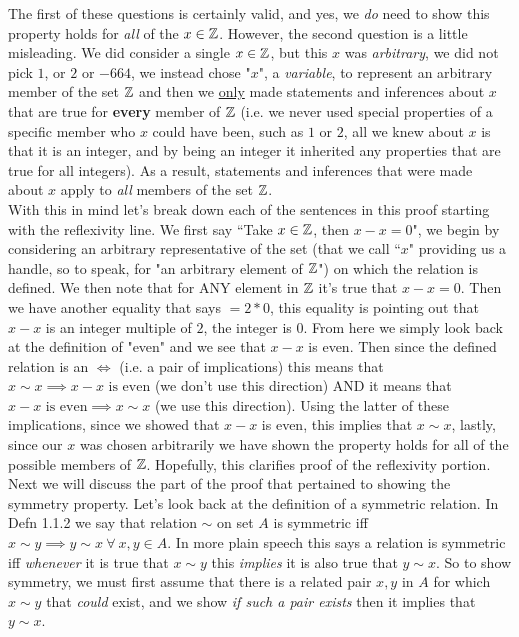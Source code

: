 \noindent The first of these questions is certainly valid, and yes, we \textit{do} need to show this property holds for \textit{all} of the $x\in {\mathbb{ Z}}$. However, the second question is a little misleading. We did consider a single $x\in {\mathbb{ Z}}$, but this $x$ was \textit{arbitrary}, we did not pick $1$, or $2$ or $-664$, we instead chose "$x$", a \textit{variable}, to represent an arbitrary member of the set ${\mathbb{ Z}}$ and then we \underline{only} made statements and inferences about $x$ that are true for \textbf{every} member of ${\mathbb{ Z}}$ (i.e. we never used special properties of a specific member who $x$ could have been, such as $1$ or $2$, all we knew about $x$ is that it is an integer, and by being an integer it inherited any properties that are true for all integers). As a result, statements and inferences that were made about $x$ apply to \textit{all} members of the set ${\mathbb{ Z}}$. \steezybreak\\
With this in mind let's break down each of the sentences in this proof starting with the reflexivity line. We first say ``Take $x\in{\mathbb{ Z}}$, then $x-x=0$", we begin by considering an arbitrary representative of the set (that we call ``$x$" providing us a handle, so to speak, for "an arbitrary element of ${\mathbb{ Z}}$") on which the relation is defined. We then note that for ANY element in ${\mathbb{ Z}}$ it's true that $x-x=0$. Then we have another equality that says $=2*0$, this equality is pointing out that $x-x$ is an integer multiple of $2$, the integer is $0$. From here we simply look back at the definition of "even" and we see that $x-x$ is even. Then since the defined relation is an $\iff$ (i.e. a pair of implications) this means that $x\sim x \implies x-x \text{ is even}$ (we don't use this direction) AND it means that $x-x \text{ is even}\implies x\sim x$ (we use this direction). Using the latter of these implications, since we showed that $x-x$ is even, this implies that $x\sim x$, lastly, since our $x$ was chosen arbitrarily we have shown the property holds for all of the possible members of ${\mathbb{ Z}}$. Hopefully, this clarifies proof of the reflexivity portion.\steezybreak\\
Next we will discuss the part of the proof that pertained to showing the symmetry property. Let's look back at the definition of a symmetric relation. In Defn 1.1.2 we say that relation $\sim$ on set $A$ is symmetric iff $x\sim y \implies y\sim x \ \forall \ x,y \in A$. In more plain speech this says a relation is symmetric iff \textit{whenever} it is true that $x\sim y$ this \textit{implies} it is also true that $y\sim x$. So to show symmetry, we must first assume that there is a related pair $x,y$ in $A$ for which $x\sim y$ that \textit{could} exist, and we show \textit{if such a pair exists} then it implies that $y\sim x$.
